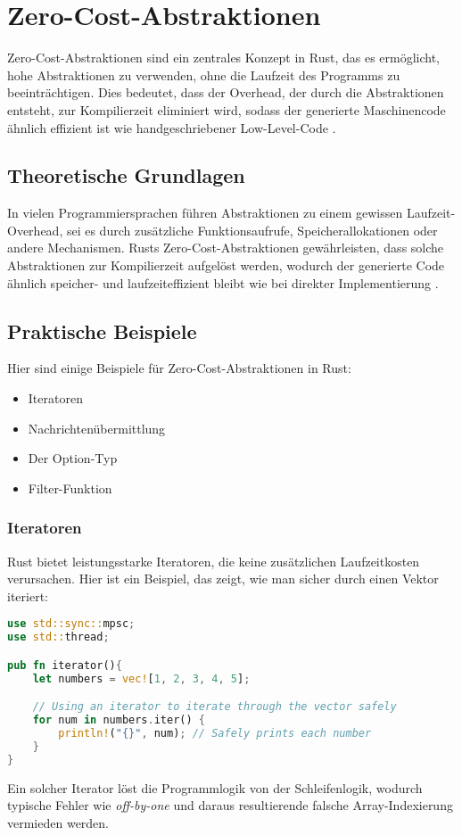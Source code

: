 \chapter{Zero-Cost-Abstraktionen}

Zero-Cost-Abstraktionen sind ein zentrales Konzept in Rust, das es ermöglicht, hohe Abstraktionen zu verwenden, ohne die Laufzeit des Programms zu beeinträchtigen. 
Dies bedeutet, dass der Overhead, der durch die Abstraktionen entsteht, zur Kompilierzeit eliminiert wird, sodass der generierte Maschinencode ähnlich effizient ist wie handgeschriebener Low-Level-Code \cite{sequeira2023}.

\section{Theoretische Grundlagen}

In vielen Programmiersprachen führen Abstraktionen zu einem gewissen Laufzeit-Overhead, sei es durch zusätzliche Funktionsaufrufe, Speicherallokationen oder andere Mechanismen.
Rusts Zero-Cost-Abstraktionen gewährleisten, dass solche Abstraktionen zur Kompilierzeit aufgelöst werden, wodurch der generierte Code ähnlich speicher- und laufzeiteffizient bleibt wie bei direkter Implementierung \cite{haberman2014}.

\section{Praktische Beispiele}

Hier sind einige Beispiele für Zero-Cost-Abstraktionen in Rust:

\begin{itemize}
    \item Iteratoren
    \item Nachrichtenübermittlung
    \item Der Option-Typ
    \item Filter-Funktion
\end{itemize}

\subsection{Iteratoren}

Rust bietet leistungsstarke Iteratoren, die keine zusätzlichen Laufzeitkosten verursachen. 
Hier ist ein Beispiel, das zeigt, wie man sicher durch einen Vektor iteriert:

\begin{lstlisting}[language=Rust, caption=Iterator]
use std::sync::mpsc;
use std::thread;

pub fn iterator(){
    let numbers = vec![1, 2, 3, 4, 5];

    // Using an iterator to iterate through the vector safely
    for num in numbers.iter() {
        println!("{}", num); // Safely prints each number
    }
}
\end{lstlisting}
Ein solcher Iterator löst die Programmlogik von der Schleifenlogik, wodurch typische Fehler wie \textit{\gls{off-by-one}} und daraus resultierende falsche Array-Indexierung vermieden werden.
\cleardoublepage
